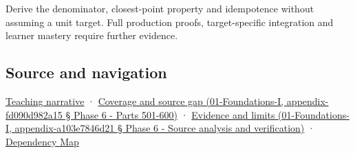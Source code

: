Derive the denominator, closest-point property and idempotence without assuming a unit target. Full production proofs, target-specific integration and learner mastery require further evidence.

\subsection{Source and navigation}\label{source-and-navigation}

\href{Continuous\%20Notes/Computing\%20Foundations\%20-\%20From\%20Bits\%20to\%20C++\%20and\%20Systems\%20APIs\#Projection\%20separates\%20useful\%20movement\%20from\%20sideways\%20movement}{Teaching narrative} · \href{}{Coverage and source gap (01-Foundations-I, appendix-fd090d982a15 § Phase 6 - Parts 501-600)} · \href{}{Evidence and limits (01-Foundations-I, appendix-a103e7846d21 § Phase 6 - Source analysis and verification)} · \hyperref[appendix-4ad47bdd269a]{Dependency Map}
